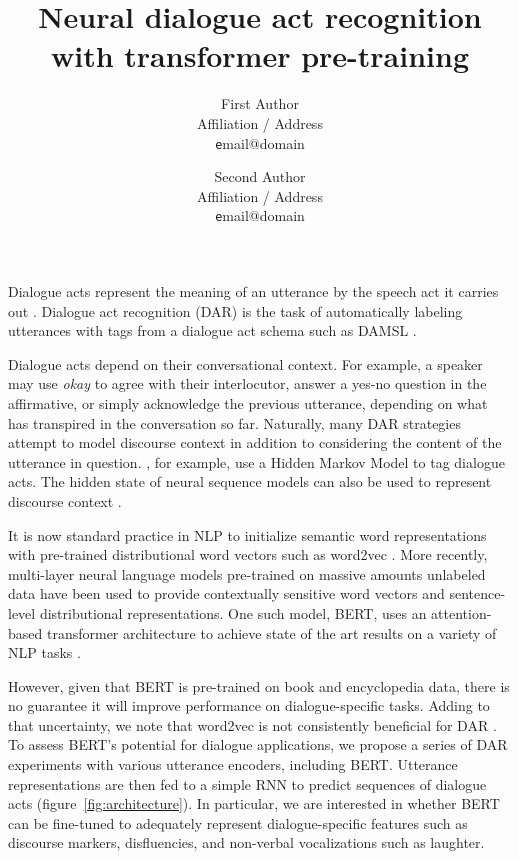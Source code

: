 \documentclass[11pt,a4paper,headings=standardclasses]{article}
\title{Neural dialogue act recognition with transformer pre-training} %
\author{
  First Author \\
  Affiliation / Address \\
  {\texttt email@domain} \\\and
  Second Author \\
  Affiliation / Address \\
  {\texttt email@domain} \\
}
\date{}
\begin{document}
\maketitle

Dialogue acts represent the meaning of an utterance by the speech act it carries out \citep{austinHowThingsWords2009}.
Dialogue act recognition (DAR) is the task of automatically labeling utterances with tags from a dialogue act schema such as DAMSL \citep{coreCodingDialogsDAMSL1997}.

Dialogue acts depend on their conversational context.
For example, a speaker may use \textit{okay} to agree with their interlocutor, answer a yes-no question in the affirmative, 
or simply acknowledge the previous utterance, depending on what has transpired in the conversation so far.
Naturally, many DAR strategies attempt to model discourse context in addition to considering the content of the utterance in question.
\cite{stolckeDialogueActModeling2000}, for example, use a Hidden Markov Model to tag dialogue acts.
The hidden state of neural sequence models can also be used to represent discourse context 
\citep[e.g.][]{kalchbrennerRecurrentConvolutionalNeural2013,tranPreservingDistributionalInformation2017}.


It is now standard practice in NLP to initialize semantic word representations
with pre-trained distributional word vectors such as word2vec \citep{mikolov2013distributed}.
More recently, multi-layer neural language models pre-trained on massive amounts unlabeled data
have been used to provide contextually sensitive word vectors and sentence-level distributional representations.
One such model, BERT, uses an attention-based transformer architecture to achieve state of the art results
on a variety of NLP tasks \citep{devlinBERTPretrainingDeep2018}.

However, given that BERT is pre-trained on book and encyclopedia data, 
there is no guarantee it will improve performance on dialogue-specific tasks.
Adding to that uncertainty, we note that word2vec is not consistently beneficial for DAR \citep{cerisaraEffectsUsingWord2vec2017}.
To assess BERT's potential for dialogue applications, we propose a series of DAR experiments 
with various utterance encoders, including BERT.
Utterance representations are then fed to a simple RNN to predict sequences of dialogue acts (figure~\ref{fig:architecture}).
In particular, we are interested in whether BERT can be fine-tuned to adequately represent
dialogue-specific features such as discourse markers, disfluencies, and non-verbal vocalizations such as laughter. 
\end{document}
